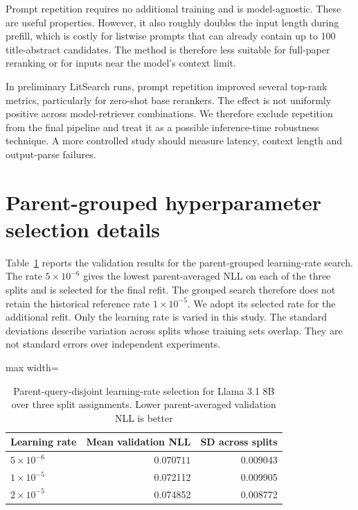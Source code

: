 \documentclass[pdflatex,sn-basic,Numbered]{sn-jnl}%
\theoremstyle{thmstyleone}%
\theoremstyle{thmstyletwo}%
\theoremstyle{thmstylethree}%
\begin{document}
Prompt repetition requires no additional training and is model-agnostic. These are
useful properties. However, it also roughly doubles the input length during
prefill, which is costly for listwise prompts that can already contain up to 100
title-abstract candidates. The method is therefore less suitable for full-paper
reranking or for inputs near the model's context limit.

In preliminary LitSearch runs, prompt repetition improved several top-rank
metrics, particularly for zero-shot base rerankers. The effect is not uniformly
positive across model-retriever combinations. We therefore exclude repetition
from the final pipeline and treat it as a possible inference-time robustness
technique. A more controlled study should measure latency, context length and
output-parse failures.

\FloatBarrier

\section{Parent-grouped hyperparameter selection details}
\label{supp:grouped-selection-details}

Table~\ref{tab:grouped-hpo-selection} reports the validation results for the
parent-grouped learning-rate search. The rate $5\times10^{-6}$ gives the
lowest parent-averaged NLL on each of the three splits and is selected for the
final refit. The grouped search therefore does not retain the historical
reference rate $1\times10^{-5}$. We adopt its selected rate for the additional
refit. Only the learning rate is varied in this study.
The standard deviations describe variation across splits whose training sets
overlap. They are not standard errors over independent experiments.

\begin{table}[t]


\centering
\scriptsize
\setlength{\tabcolsep}{4pt}
\begin{adjustbox}{max width=\linewidth}
\begin{tabular}{lrr}
\hline
Learning rate & Mean validation NLL & SD across splits \\
\hline
$5\times10^{-6}$ & $\mathbf{0.070711}$ & 0.009043 \\
$1\times10^{-5}$ & 0.072112 & 0.009905 \\
$2\times10^{-5}$ & 0.074852 & 0.008772 \\
\hline
\end{tabular}
\end{adjustbox}


\caption{Parent-query-disjoint learning-rate selection for Llama 3.1 8B over three split assignments. Lower parent-averaged validation NLL is better}
\label{tab:grouped-hpo-selection}
\end{table}
\end{document}
